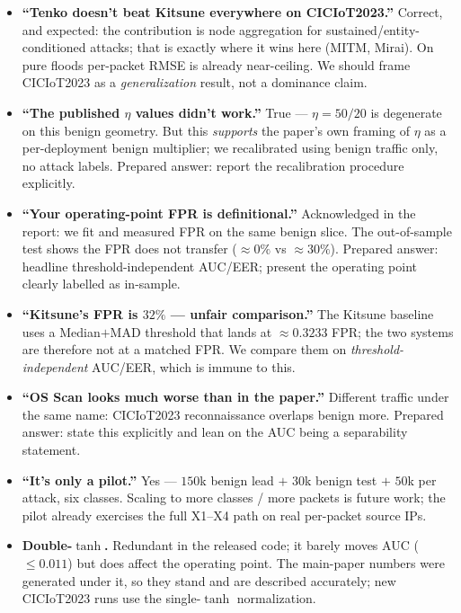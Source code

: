 \documentclass[11pt]{article}
\begin{document}
\begin{itemize}
  \item \textbf{``Tenko doesn't beat Kitsune everywhere on CICIoT2023.''} Correct, and expected: the
        contribution is node aggregation for sustained/entity-conditioned attacks; that is exactly
        where it wins here (MITM, Mirai). On pure floods per-packet RMSE is already near-ceiling.
        We should frame CICIoT2023 as a \emph{generalization} result, not a dominance claim.
  \item \textbf{``The published $\eta$ values didn't work.''} True --- $\eta=50/20$ is degenerate on
        this benign geometry. But this \emph{supports} the paper's own framing of $\eta$ as a
        per-deployment benign multiplier; we recalibrated using benign traffic only, no attack
        labels. Prepared answer: report the recalibration procedure explicitly.
  \item \textbf{``Your operating-point FPR is definitional.''} Acknowledged in the report: we fit and
        measured FPR on the same benign slice. The out-of-sample test shows the FPR does not transfer
        ($\approx 0\%$ vs $\approx 30\%$). Prepared answer: headline threshold-independent AUC/EER;
        present the operating point clearly labelled as in-sample.
  \item \textbf{``Kitsune's FPR is $32\%$ --- unfair comparison.''} The Kitsune baseline uses a
        Median$+$MAD threshold that lands at $\approx 0.3233$ FPR; the two systems are therefore not
        at a matched FPR. We compare them on \emph{threshold-independent} AUC/EER, which is immune to
        this.
  \item \textbf{``OS Scan looks much worse than in the paper.''} Different traffic under the same
        name: CICIoT2023 reconnaissance overlaps benign more. Prepared answer: state this explicitly
        and lean on the AUC being a separability statement.
  \item \textbf{``It's only a pilot.''} Yes --- $150$k benign lead $+$ $30$k benign test $+$ $50$k per
        attack, six classes. Scaling to more classes / more packets is future work; the pilot already
        exercises the full X1--X4 path on real per-packet source IPs.
  \item \textbf{Double-$\tanh$.} Redundant in the released code; it barely moves AUC ($\le 0.011$) but
        does affect the operating point. The main-paper numbers were generated under it, so they
        stand and are described accurately; new CICIoT2023 runs use the single-$\tanh$ normalization.
\end{itemize}
\end{document}
